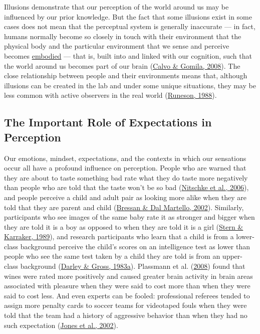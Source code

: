 \documentclass[
]{krantz}
\begin{document}
Illusions demonstrate that our perception of the world around us may be influenced by our prior knowledge. But the fact that some illusions exist in some cases does not mean that the perceptual system is generally inaccurate --- in fact, humans normally become so closely in touch with their environment that the physical body and the particular environment that we sense and perceive becomes \protect\hyperlink{embodied}{embodied} --- that is, built into and linked with our cognition, such that the world around us becomes part of our brain (\protect\hyperlink{ref-calvo2008handbook}{Calvo \& Gomila, 2008}). The close relationship between people and their environments means that, although illusions can be created in the lab and under some unique situations, they may be less common with active observers in the real world (\protect\hyperlink{ref-Runeson1988}{Runeson, 1988}).

\hypertarget{the-important-role-of-expectations-in-perception}{%
\subsection*{The Important Role of Expectations in Perception}\label{the-important-role-of-expectations-in-perception}}


Our emotions, mindset, expectations, and the contexts in which our sensations occur all have a profound influence on perception. People who are warned that they are about to taste something bad rate what they do taste more negatively than people who are told that the taste won't be so bad (\protect\hyperlink{ref-nitschke2006altering}{Nitschke et al., 2006}), and people perceive a child and adult pair as looking more alike when they are told that they are parent and child (\protect\hyperlink{ref-Bressan2002}{Bressan \& Dal Martello, 2002}). Similarly, participants who see images of the same baby rate it as stronger and bigger when they are told it is a boy as opposed to when they are told it is a girl (\protect\hyperlink{ref-Stern1989}{Stern \& Karraker, 1989}), and research participants who learn that a child is from a lower-class background perceive the child's scores on an intelligence test as lower than people who see the same test taken by a child they are told is from an upper-class background (\protect\hyperlink{ref-Darley1983}{Darley \& Gross, 1983a}). Plassmann et al. (\protect\hyperlink{ref-plassmann2008marketing}{2008}) found that wines were rated more positively and caused greater brain activity in brain areas associated with pleasure when they were said to cost more than when they were said to cost less. And even experts can be fooled: professional referees tended to assign more penalty cards to soccer teams for videotaped fouls when they were told that the team had a history of aggressive behavior than when they had no such expectation (\protect\hyperlink{ref-Jones2002}{Jones et al., 2002}).
\end{document}
